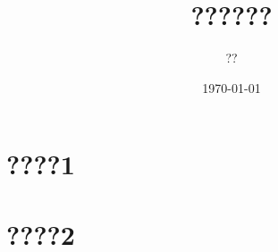 \documentclass[UTF8]{ctexart}
\title{??????}
\author{??}
\date{\today}
\begin{document}
\maketitle
\tableofcontents
\section{????1}
\section{????2}

\end{document}
